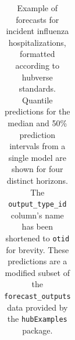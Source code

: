 \documentclass[
]{article}
\begin{document}
\begin{longtable}[]{@{}
  >{\raggedright\arraybackslash}p{}
  >{\raggedright\arraybackslash}p{}
  >{\raggedright\arraybackslash}p{}
  >{\raggedleft\arraybackslash}p{}
  >{\raggedright\arraybackslash}p{}
  >{\raggedright\arraybackslash}p{}
  >{\raggedright\arraybackslash}p{}
  >{\raggedleft\arraybackslash}p{}@{}}

\caption{\label{tbl-example-forecasts}Example of forecasts for incident
influenza hospitalizations, formatted according to hubverse standards.
Quantile predictions for the median and 50\% prediction intervals from a
single model are shown for four distinct horizons. The
\texttt{output\_type\_id} column's name has been shortened to
\texttt{otid} for brevity. These predictions are a modified subset of
the \texttt{forecast\_outputs} data provided by the \texttt{hubExamples}
package.}

\tabularnewline


\end{longtable}
\end{document}
